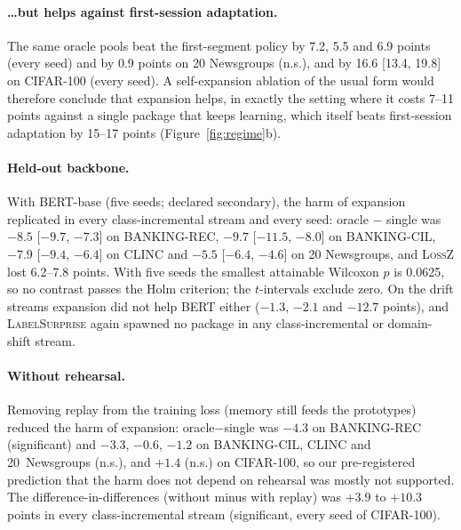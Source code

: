 \documentclass[10pt]{article}
\newcommand{\ls}{\textsc{LabelSurprise}}
\begin{document}
\paragraph{\ldots but helps against first-session adaptation.} The same oracle pools beat the first-segment policy by 7.2, 5.5 and 6.9 points (every seed) and by 0.9 points on 20 Newsgroups (n.s.), and by 16.6 [13.4, 19.8] on CIFAR-100 (every seed). A self-expansion ablation of the usual form would therefore conclude that expansion helps, in exactly the setting where it costs 7--11 points against a single package that keeps learning, which itself beats first-session adaptation by 15--17 points (Figure~\ref{fig:regime}b).

\paragraph{Held-out backbone.} With BERT-base (five seeds; declared secondary), the harm of expansion replicated in every class-incremental stream and every seed: oracle $-$ single was $-8.5$ [$-9.7$, $-7.3$] on BANKING-REC, $-9.7$ [$-11.5$, $-8.0$] on BANKING-CIL, $-7.9$ [$-9.4$, $-6.4$] on CLINC and $-5.5$ [$-6.4$, $-4.6$] on 20 Newsgroups, and \textsc{LossZ} lost 6.2--7.8 points. With five seeds the smallest attainable Wilcoxon $p$ is 0.0625, so no contrast passes the Holm criterion; the $t$-intervals exclude zero. On the drift streams expansion did not help BERT either ($-1.3$, $-2.1$ and $-12.7$ points), and \ls{} again spawned no package in any class-incremental or domain-shift stream.

\paragraph{Without rehearsal.} Removing replay from the training loss (memory still feeds the prototypes) reduced the harm of expansion: oracle$-$single was $-4.3$ on BANKING-REC (significant) and $-3.3$, $-0.6$, $-1.2$ on BANKING-CIL, CLINC and 20~Newsgroups (n.s.), and $+1.4$ (n.s.) on CIFAR-100, so our pre-registered prediction that the harm does not depend on rehearsal was mostly not supported. The difference-in-differences (without minus with replay) was $+3.9$ to $+10.3$ points in every class-incremental stream (significant, every seed of CIFAR-100).
\end{document}
